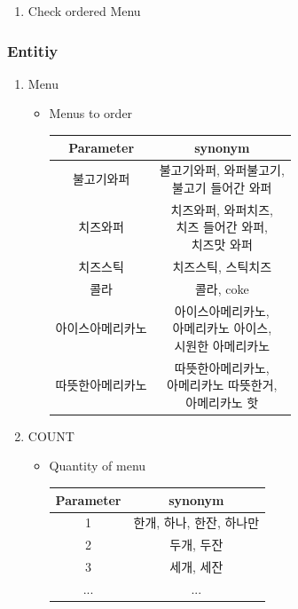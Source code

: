 \documentclass[conference,compsoc]{IEEEtran}
\begin{document}
\begin{enumerate}
\begin{enumerate}
  \end{enumerate}

  \item Check ordered Menu
\end{enumerate}

\subsubsection{Entitiy}
\begin{enumerate}
  \item Menu
  \begin{itemize}
    \item Menus to order
    \begin{table}[h!] \renewcommand\arraystretch{1.25}
      \centering
        \begin{tabular}{@{}c | c @{}}
        \hline
        Parameter & synonym \\ 
        \hline
        불고기와퍼 & \makecell{불고기와퍼, 와퍼불고기, \\ 불고기 들어간 와퍼} \\ 
        \hline
        치즈와퍼 & \makecell{치즈와퍼, 와퍼치즈, \\ 치즈 들어간 와퍼, \\ 치즈맛 와퍼} \\
        \hline
        치즈스틱 & 치즈스틱, 스틱치즈 \\
        \hline
        콜라 & 콜라, coke \\
        \hline
        아이스아메리카노 &	\makecell{아이스아메리카노, \\ 아메리카노 아이스, \\ 시원한 아메리카노} \\
        \hline
        따뜻한아메리카노	& \makecell{따뜻한아메리카노, \\ 아메리카노 따뜻한거, \\ 아메리카노 핫} \\
        \hline
        \end{tabular}
    \end{table} 

  \end{itemize}

  \item COUNT
  \begin{itemize}
    \item Quantity of menu
    \begin{table}[h!] \renewcommand\arraystretch{1.25}
      \centering
        \begin{tabular}{@{}c | c @{}}
        \hline
        Parameter & synonym \\ 
        \hline
        1 & 한개, 하나, 한잔, 하나만 \\ 
        \hline
        2 & 두개, 두잔 \\
        \hline
        3 & 세개, 세잔 \\
        \hline
        ... & ... \\
        \hline
        \end{tabular}
    \end{table} 


\end{itemize}
\end{enumerate}
\end{document}
